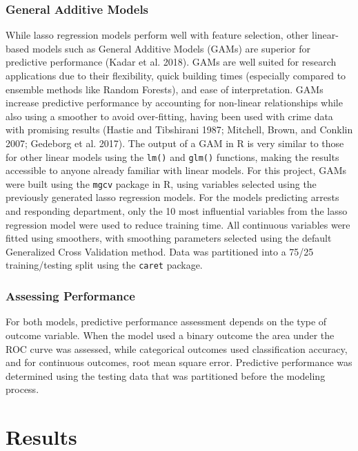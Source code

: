 \documentclass{ucetd}
\begin{document}
\hypertarget{general-additive-models}{%
\subsection{General Additive Models}\label{general-additive-models}}

While lasso regression models perform well with feature selection, other
linear-based models such as General Additive Models (GAMs) are superior
for predictive performance (Kadar et al. 2018). GAMs are well suited for
research applications due to their flexibility, quick building times
(especially compared to ensemble methods like Random Forests), and ease
of interpretation. GAMs increase predictive performance by accounting
for non-linear relationships while also using a smoother to avoid
over-fitting, having been used with crime data with promising results
(Hastie and Tibshirani 1987; Mitchell, Brown, and Conklin 2007; Gedeborg
et al. 2017). The output of a GAM in R is very similar to those for
other linear models using the \texttt{lm()} and \texttt{glm()}
functions, making the results accessible to anyone already familiar with
linear models. For this project, GAMs were built using the \texttt{mgcv}
package in R, using variables selected using the previously generated
lasso regression models. For the models predicting arrests and
responding department, only the 10 most influential variables from the
lasso regression model were used to reduce training time. All continuous
variables were fitted using smoothers, with smoothing parameters
selected using the default Generalized Cross Validation method. Data was
partitioned into a 75/25 training/testing split using the \texttt{caret}
package.

\hypertarget{assessing-performance}{%
\subsection{Assessing Performance}\label{assessing-performance}}

For both models, predictive performance assessment depends on the type
of outcome variable. When the model used a binary outcome the area under
the ROC curve was assessed, while categorical outcomes used
classification accuracy, and for continuous outcomes, root mean square
error. Predictive performance was determined using the testing data that
was partitioned before the modeling process.

\hypertarget{results}{%
\chapter{Results}\label{results}}
\end{document}
